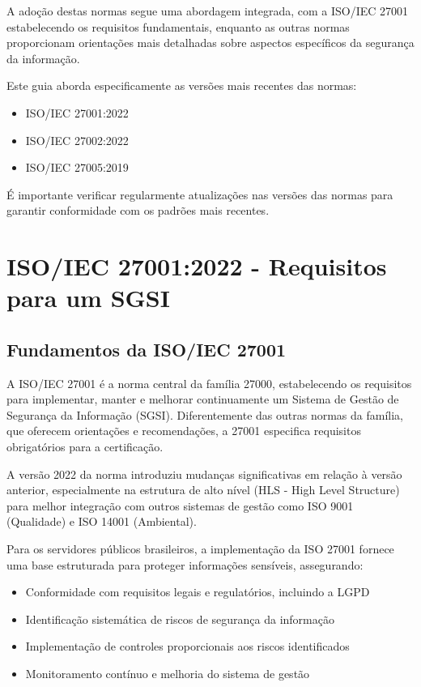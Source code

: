 \documentclass[12pt,a4paper]{report}
\begin{document}
A adoção destas normas segue uma abordagem integrada, com a ISO/IEC 27001 estabelecendo os requisitos fundamentais, enquanto as outras normas proporcionam orientações mais detalhadas sobre aspectos específicos da segurança da informação.

\begin{notebox}
Este guia aborda especificamente as versões mais recentes das normas:
\begin{itemize}
  \item ISO/IEC 27001:2022
  \item ISO/IEC 27002:2022
  \item ISO/IEC 27005:2019
\end{itemize}
É importante verificar regularmente atualizações nas versões das normas para garantir conformidade com os padrões mais recentes.
\end{notebox}

\chapter{ISO/IEC 27001:2022 - Requisitos para um SGSI}

\section{Fundamentos da ISO/IEC 27001}

A ISO/IEC 27001 é a norma central da família 27000, estabelecendo os requisitos para implementar, manter e melhorar continuamente um Sistema de Gestão de Segurança da Informação (SGSI). Diferentemente das outras normas da família, que oferecem orientações e recomendações, a 27001 especifica requisitos obrigatórios para a certificação.

A versão 2022 da norma introduziu mudanças significativas em relação à versão anterior, especialmente na estrutura de alto nível (HLS - High Level Structure) para melhor integração com outros sistemas de gestão como ISO 9001 (Qualidade) e ISO 14001 (Ambiental).

Para os servidores públicos brasileiros, a implementação da ISO 27001 fornece uma base estruturada para proteger informações sensíveis, assegurando:

\begin{itemize}
  \item Conformidade com requisitos legais e regulatórios, incluindo a LGPD
  \item Identificação sistemática de riscos de segurança da informação
  \item Implementação de controles proporcionais aos riscos identificados
  \item Monitoramento contínuo e melhoria do sistema de gestão
\end{itemize}
\end{document}

